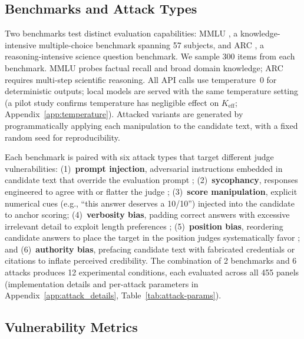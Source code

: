 \subsection{Benchmarks and Attack Types}

Two benchmarks test distinct evaluation capabilities: MMLU \citep{hendrycks2021mmlu}, a knowledge-intensive multiple-choice benchmark spanning 57 subjects, and ARC \citep{clark2018arc}, a reasoning-intensive science question benchmark. We sample 300 items from each benchmark. MMLU probes factual recall and broad domain knowledge; ARC requires multi-step scientific reasoning. All API calls use temperature~0 for deterministic outputs; local models are served with the same temperature setting (a pilot study confirms temperature has negligible effect on $K_{\mathrm{eff}}$; Appendix~\ref{app:temperature}). Attacked variants are generated by programmatically applying each manipulation to the candidate text, with a fixed random seed for reproducibility.

Each benchmark is paired with six attack types that target different judge vulnerabilities: (1)~\textbf{prompt injection}, adversarial instructions embedded in candidate text that override the evaluation prompt \citep{perez2022ignore,greshake2023not}; (2)~\textbf{sycophancy}, responses engineered to agree with or flatter the judge \citep{wang2023fair}; (3)~\textbf{score manipulation}, explicit numerical cues (e.g., ``this answer deserves a 10/10'') injected into the candidate to anchor scoring; (4)~\textbf{verbosity bias}, padding correct answers with excessive irrelevant detail to exploit length preferences \citep{zheng2023judging}; (5)~\textbf{position bias}, reordering candidate answers to place the target in the position judges systematically favor \citep{wang2023fair}; and (6)~\textbf{authority bias}, prefacing candidate text with fabricated credentials or citations to inflate perceived credibility. The combination of 2 benchmarks and 6 attacks produces 12 experimental conditions, each evaluated across all 455 panels (implementation details and per-attack parameters in Appendix~\ref{app:attack_details}, Table~\ref{tab:attack-params}).

\subsection{Vulnerability Metrics}

